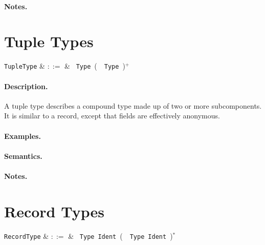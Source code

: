 \paragraph{Notes.} 


\section{Tuple Types}

\begin{syntax}
  \verb+TupleType+ & $::=$ & \token{(}\ \verb+Type+\ \big(\ \token{,}\
  \verb+Type+\ \big)$^+$\ \token{)}\\
\end{syntax}

\paragraph{Description.}  A tuple type describes a compound type made
up of two or more subcomponents. It is similar to a record, except
that fields are effectively anonymous.

\paragraph{Examples.}

\paragraph{Semantics.}

\paragraph{Notes.}


\section{Record Types}

\begin{syntax}
  \verb+RecordType+ & $::=$ & \token{\{}\ \verb+Type+\
  \verb+Ident+\ \big(\ \token{,}\ \verb+Type+\ \verb+Ident+\
  \big)$^*$ \ \token{\}}\\
\end{syntax}


